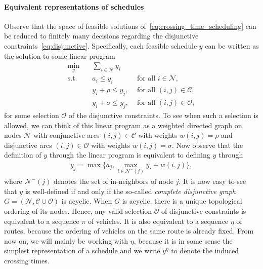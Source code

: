 \documentclass[a4paper]{article}
\theoremstyle{definition}
\theoremstyle{plain}
\begin{document}
\paragraph{Equivalent representations of schedules}
Observe that the space of feasible solutions
of~\eqref{eq:crossing_time_scheduling} can be reduced to finitely many decisions
regarding the disjunctive constraints~\eqref{eq:disjunctive}. Specifically, each
feasible schedule $y$ can be written as the solution to some linear program
\begin{align*}
  \min_{y} \quad & \sum_{i \in \mathcal{N}} y_{i} \\
  \text{s.t.} \quad & a_{i} \leq y_{i} & \text{ for all } i \in \mathcal{N}, \\
           & y_{i} + \rho \leq y_{j}, & \text{ for all } (i,j) \in \mathcal{C}, \\
           & y_{i} + \sigma \leq y_{j}, & \text{ for all } (i,j) \in \mathcal{O} ,
\end{align*}
for some selection $\mathcal{O}$ of the disjunctive constraints. To see when
such a selection is allowed, we can think of this linear program as a weighted
directed graph on nodes $\mathcal{N}$ with conjunctive arcs
$(i,j) \in \mathcal{C}$ with weights $w(i,j) = \rho$ and disjunctive arcs
$(i,j) \in \mathcal{O}$ with weights $w(i,j) = \sigma$. Now observe that the
definition of $y$ through the linear program is equivalent to defining $y$
through
\begin{align}
  \label{eq:y_max}
  y_{j} = \max\{ a_{j}, \max_{i \in \mathcal{N}^{-}(j)} y_i + w(i,j) \} ,
\end{align}
where $\mathcal{N}^{-}(j)$ denotes the set of in-neighbors of node $j$. It is
now easy to see that $y$ is well-defined if and only if the so-called
\textit{complete disjunctive graph}
$G=(\mathcal{N}, \mathcal{C} \cup \mathcal{O})$ is acyclic.
%
When $G$ is acyclic, there is a unique topological ordering of its nodes. Hence,
any valid selection $\mathcal{O}$ of disjunctive constraints is equivalent to a
sequence $\pi$ of vehicles. It is also equivalent to a sequence $\eta$ of
routes, because the ordering of vehicles on the same route is already fixed.
From now on, we will mainly be working with $\eta$, because it is in some sense
the simplest representation of a schedule and we write $y^{\eta}$ to denote the
induced crossing times.
\end{document}
